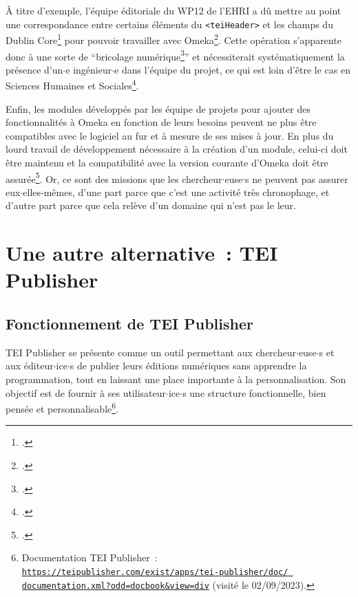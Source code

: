 \bigskip
\bigskip
\bigskip
\bigskip
À titre d'exemple, l'équipe éditoriale du WP12 de l'EHRI a dû mettre au point une correspondance entre certains éléments du \texttt{<teiHeader>} et les champs du Dublin Core\footcite[p.~7-9]{Ehri2018} pour pouvoir travailler avec Omeka\footcite[p.~9]{Leblanc2020}. Cette opération s'apparente donc à une sorte de \enquote{bricolage numérique\footcite[p.~96]{BoulaireCarabelli2017}} et nécessiterait systématiquement la présence d'un$\cdot$e ingénieur$\cdot$e dans l'équipe du projet, ce qui est loin d'être le cas en Sciences Humaines et Sociales\footcite[p.~98]{BoulaireCarabelli2017}.  

Enfin, les modules développés par les équipe de projets pour ajouter des fonctionnalités à Omeka en fonction de leurs besoins peuvent ne plus être compatibles avec le logiciel au fur et à mesure de ses mises à jour. En plus du lourd travail de développement nécessaire à la création d'un module, celui-ci doit être maintenu et la compatibilité avec la version courante d'Omeka doit être assurée\footcite[p.~16]{Leblanc2020}. Or, ce sont des missions que les chercheur$\cdot$euse$\cdot$s ne peuvent pas assurer eux$\cdot$elles-mêmes, d'une part parce que c'est une activité très chronophage, et d'autre part parce que cela relève d'un domaine qui n'est pas le leur.  



\section{Une autre alternative~: TEI Publisher}

\subsection{Fonctionnement de TEI Publisher}
TEI Publisher se présente comme un outil permettant aux chercheur$\cdot$euse$\cdot$s et aux éditeur$\cdot$ice$\cdot$s de publier leurs éditions numériques sans apprendre la programmation, tout en laissant une place importante à la personnalisation. Son objectif est de fournir à ses utilisateur$\cdot$ice$\cdot$s une structure fonctionnelle, bien pensée et personnalisable\footnote{Documentation TEI Publisher~: \texttt{\href{https://teipublisher.com/exist/apps/tei-publisher/doc/documentation.xml?odd=docbook&view=div}{https://teipublisher.com/exist/apps/tei-publisher/doc/ documentation.xml?odd=docbook\&view=div}} (visité le 02/09/2023).}.  

